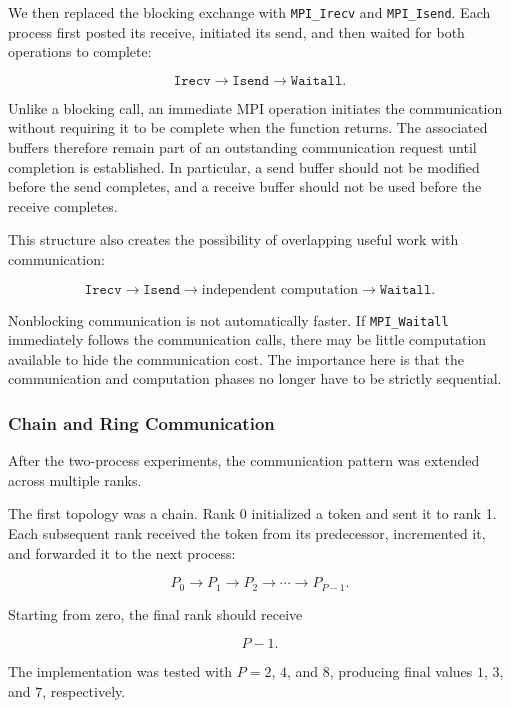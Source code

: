 We then replaced the blocking exchange with
\texttt{MPI\_Irecv} and \texttt{MPI\_Isend}. Each process first posted
its receive, initiated its send, and then waited for both operations to
complete:

$$
\texttt{Irecv}
\rightarrow
\texttt{Isend}
\rightarrow
\texttt{Waitall}.
$$

Unlike a blocking call, an immediate MPI operation initiates the
communication without requiring it to be complete when the function
returns. The associated buffers therefore remain part of an outstanding
communication request until completion is established. In particular,
a send buffer should not be modified before the send completes, and a
receive buffer should not be used before the receive completes.

This structure also creates the possibility of overlapping useful work
with communication:

$$
\texttt{Irecv}
\rightarrow
\texttt{Isend}
\rightarrow
\text{independent computation}
\rightarrow
\texttt{Waitall}.
$$

Nonblocking communication is not automatically faster. If
\texttt{MPI\_Waitall} immediately follows the communication calls,
there may be little computation available to hide the communication
cost. The importance here is that the communication and computation
phases no longer have to be strictly sequential.

\subsubsection{Chain and Ring Communication}

After the two-process experiments, the communication pattern was
extended across multiple ranks.

The first topology was a chain. Rank 0 initialized a token and sent it
to rank 1. Each subsequent rank received the token from its predecessor,
incremented it, and forwarded it to the next process:

$$
P_0
\rightarrow
P_1
\rightarrow
P_2
\rightarrow
\cdots
\rightarrow
P_{P-1}.
$$

Starting from zero, the final rank should receive

$$
P-1.
$$

The implementation was tested with $P=2$, $4$, and $8$, producing final
values $1$, $3$, and $7$, respectively.

